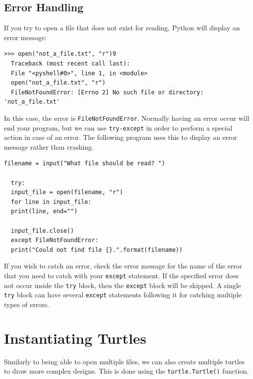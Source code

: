 \documentclass[11pt]{cselabheader}
\begin{document}
\subsection{Error Handling}
If you try to open a file that does not exist for reading, Python will display an error message:

\begin{lstlisting}[style=ipython]
  >>> open("not_a_file.txt", "r")9
  Traceback (most recent call last):
  File "<pyshell#0>", line 1, in <module>
  open("not_a_file.txt", "r")
  FileNotFoundError: [Errno 2] No such file or directory: 'not_a_file.txt'
\end{lstlisting}

In this case, the error is \lstinline{FileNotFoundError}. Normally having an error occur will end your program, but we can use \lstinline{try-except} in order to perform a special action in case of an error. The following program uses this to display an error message rather than crashing.

\begin{lstlisting}[style=python]
  filename = input("What file should be read? ")

  try:
  input_file = open(filename, "r")
  for line in input_file:
  print(line, end="")

  input_file.close()
  except FileNotFoundError:
  print("Could not find file {}.".format(filename))
\end{lstlisting}

If you wish to catch an error, check the error message for the name of the error that you need to catch with your \lstinline{except} statement. If the specified error does not occur inside the \lstinline{try} block, then the \lstinline{except} block will be skipped. A single \lstinline{try} block can have several \lstinline{except} statements following it for catching multiple types of errors.




\section{Instantiating Turtles}
Similarly to being able to open multiple files, we can also create multiple turtles to draw more complex designs. This is done using the \lstinline{turtle.Turtle()} function.
\end{document}
